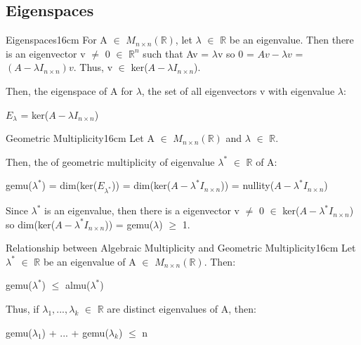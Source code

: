     \vspace{0.5cm}





\subsection{ Eigenspaces }

    \begin{definition}{Eigenspaces}{16cm}
        For A $\in$ $M_{n \times n}(\mathbb{R})$, let
        $\lambda$ $\in$ $\mathbb{R}$ be an eigenvalue.
        Then there is an eigenvector v $\not =$ 0 $\in$ $\mathbb{R}^n$
        such that Av = $\lambda$v so
        0 = $Av - \lambda v$ = $(A - \lambda I_{n \times n})v$.
        Thus, v $\in$ ker($A - \lambda I_{n \times n}$).

        Then, the {\color{lblue} eigenspace} of A for $\lambda$,
        the set of all eigenvectors v with eigenvalue $\lambda$:

        \hspace{0.5cm}
        $E_{\lambda}$ = ker($A - \lambda I_{n \times n}$)
    \end{definition}

    \vspace{0.5cm}



    \begin{definition}{Geometric Multiplicity}{16cm}
        Let A $\in$ $M_{n \times n}(\mathbb{R})$ and $\lambda$ $\in$ $\mathbb{R}$.

        Then, the of {\color{lblue} geometric multiplicity}
        of eigenvalue $\lambda^*$ $\in$ $\mathbb{R}$ of A:
        
        \hspace{0.5cm}
        gemu($\lambda^*$)
        = dim(ker($E_{\lambda^*}$))
        = dim(ker($A - \lambda^* I_{n \times n}$))
        = nullity($A - \lambda^* I_{n \times n}$)

        Since $\lambda^*$ is an eigenvalue, then there is a eigenvector
        v $\not =$ 0 $\in$ ker($A - \lambda^* I_{n \times n}$)
        so dim(ker($A - \lambda^* I_{n \times n}$)) = gemu($\lambda$) $\geq$ 1.
    \end{definition}

    \vspace{0.5cm}



    \begin{wtheorem}{Relationship between Algebraic Multiplicity and
    Geometric Multiplicity}{16cm}
        Let $\lambda^*$ $\in$ $\mathbb{R}$ be an eigenvalue
        of A $\in$ $M_{n \times n}(\mathbb{R})$. Then:

        \hspace{0.5cm}
        gemu($\lambda^*$) $\leq$ almu($\lambda^*$)

        Thus, if $\lambda_1,...,\lambda_k$ $\in$ $\mathbb{R}$
        are distinct eigenvalues of A, then:

        \hspace{0.5cm}
        gemu($\lambda_1$) + ... + gemu($\lambda_k$) $\leq$ n
    \end{wtheorem}

